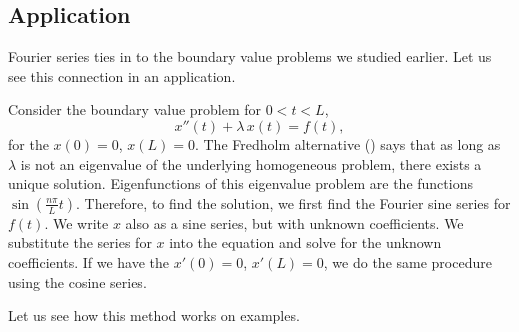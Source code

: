 \subsection{Application}

Fourier series ties in to the boundary value problems
we studied earlier.  Let us see this connection in an application.

Consider the boundary value problem for $0 < t < L$,
\begin{equation*}
x''(t) + \lambda\, x(t) = f(t) ,
\end{equation*}
for the \emph{}
$x(0) = 0$, $x(L) = 0$.
The Fredholm alternative ()
says that
as long as $\lambda$ is not an eigenvalue of the underlying homogeneous
problem, there exists a unique solution.
Eigenfunctions of this eigenvalue problem are the functions
$\sin \left( \frac{n \pi}{L} t \right)$.
Therefore,
to find the solution,
we first find the Fourier sine series for $f(t)$.
We write $x$ also as a sine series, but with unknown coefficients.  
We substitute the series for $x$ into the equation and solve for the unknown
coefficients.
If we have
the \emph{}
$x'(0) = 0$, $x'(L) = 0$, we do the same procedure using the cosine
series.

Let us see how this method works on examples.


